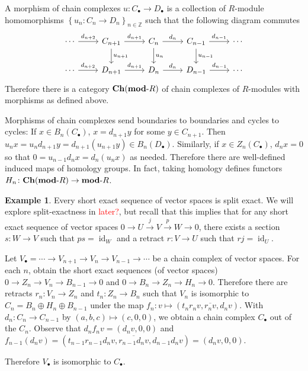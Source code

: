 \documentclass[11pt,leqno]{article}
\newcommand{\sai}[1]{\textcolor{red}{#1}}
\theoremstyle{plain}
\theoremstyle{definition}
\newtheorem{example}[lem]{Example}
\numberwithin{equation}{section}
\numberwithin{lem}{section}
\newcommand{\cbr}[1]{\left\{#1\right\}}
\newcommand{\idx}[1]{#1\index{#1}} %
\DeclareMathOperator{\id}{id}
\newcommand{\catname}[1]{{\normalfont\mathbf{#1}}}
\newcommand{\modR}{\catname{mod}\text{-}R}
\newcommand{\Ch}{\catname{Ch}}
\begin{document}
A morphism of chain complexes $u\colon C_\bullet\to D_\bullet$ is a collection of $R$-module homomorphisms $\cbr{u_n\colon C_n\to D_n}_{n\in\mathbb Z}$ such that the following diagram commutes
\[\begin{tikzcd}[ampersand replacement=\&]
	\cdots \& {C_{n+1}} \& {C_n} \& {C_{n-1}} \& \cdots \\
	\cdots \& {D_{n+1}} \& {D_n} \& {D_{n-1}} \& \cdots
	\arrow["{d_{n+2}}", from=1-1, to=1-2]
	\arrow["{d_{n+1}}", from=1-2, to=1-3]
	\arrow["{u_{n+1}}", from=1-2, to=2-2]
	\arrow["{d_{n}}", from=1-3, to=1-4]
	\arrow["{u_n}", from=1-3, to=2-3]
	\arrow["{d_{n-1}}", from=1-4, to=1-5]
	\arrow["{u_{n-1}}", from=1-4, to=2-4]
	\arrow["{d_{n+2}}", from=2-1, to=2-2]
	\arrow["{d_{n+1}}", from=2-2, to=2-3]
	\arrow["{d_{n}}", from=2-3, to=2-4]
	\arrow["{d_{n-1}}", from=2-4, to=2-5]
\end{tikzcd}\] 
Therefore there is a category \idx{$\Ch(\modR)$} of chain complexes of $R$-modules with morphisms as defined above.

Morphisms of chain complexes send boundaries to boundaries and cycles to cycles: If $x\in B_n(C_\bullet)$, $x = d_{n+1}y$ for some $y\in C_{n+1}$. Then $u_nx = u_nd_{n+1}y = d_{n+1}(u_{n+1}y)\in B_n(D_\bullet)$. Similarly, if $x\in Z_n(C_\bullet)$, $d_nx = 0$ so that $0 = u_{n-1}d_nx = d_n(u_nx)$ as needed. Therefore there are well-defined induced maps of homology groups. In fact, taking homology defines functors $H_n\colon \Ch(\modR)\to \modR$.

\begin{example}
    Every short exact sequence of vector spaces is split exact. We will explore split-exactness in \sai{later?}, but recall that this implies that for any short exact sequence of vector spaces $0\to U\xrightarrow{j}V\xrightarrow{p}W\to 0$, there exists a section $s\colon W\to V$ such that $ps = \id_W$ and a retract $r\colon V\to U$ such that $rj = \id_U$.

    Let $V_\bullet = \cdots\to V_{n+1}\to V_n\to V_{n-1}\to\cdots$ be a chain complex of vector spaces. For each $n$, obtain the short exact sequences (of vector spaces) $0\to Z_n\to V_n\to B_{n-1}\to 0$ and $0\to B_n\to Z_n\to H_n\to 0$. Therefore there are retracts $r_n\colon V_n\to Z_n$ and $t_n\colon Z_n\to B_n$ such that $V_n$ is isomorphic to $C_n = B_n\oplus H_n\oplus B_{n-1}$ under the map $f_n\colon v\mapsto (t_nr_nv, \overline{r_nv}, d_nv)$. With $d_n\colon C_n\to C_{n-1}$ by $(a,b,c)\mapsto (c,0,0)$, we obtain a chain complex $C_\bullet$ out of the $C_n$. Observe that $d_nf_nv = (d_nv, 0, 0)$ and $f_{n-1}(d_nv) = (t_{n-1}r_{n-1}d_nv, \overline{r_{n-1}d_nv}, d_{n-1}d_nv) = (d_nv, 0, 0)$.
    
    Therefore $V_\bullet$ is isomorphic to $C_\bullet$.
\end{example}
\end{document}
